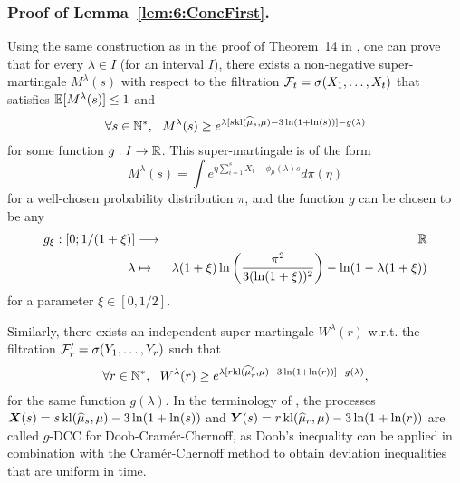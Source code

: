 \subsubsection{Proof of Lemma~\ref{lem:6:ConcFirst}.}
\label{app:6:proofConcFirst}
%
Using the same construction as in the proof of Theorem~14 in \cite{KK18Martingales}, one can prove that for every $\lambda \in I$ (for an interval $I$), there exists a non-negative super-martingale $M^\lambda (s)$ with respect to the filtration $\mathcal{F}_t = \sigma(X_1,\dots,X_t)$ that satisfies $\mathbb{E}[M^\lambda(s)] \leq 1$ and
\[\forall s \in \mathbb{N}^*, \ \ M^\lambda (s) \geq e^{\lambda [s\mathrm{kl}(\widehat{\mu}_s,\mu) - 3\ln(1+\ln(s))] - g(\lambda)}\]
for some function $g : I \rightarrow \mathbb{R}$. This super-martingale is of the form
\[M^\lambda (s) = \int e^{\eta\sum_{i=1}^s X_i - \phi_\mu(\lambda)s} d\pi(\eta)\]
for a well-chosen probability distribution $\pi$, and the function $g$ can be chosen to be any
\begin{eqnarray*}
    g_{\xi} : \left[0; 1/(1+\xi)\right] & \longrightarrow & \mathbb{R} \\
    \lambda & \mapsto & \lambda(1+\xi) \ln \left(\frac{\pi^2}{3(\ln(1+\xi))^2}\right) -  \ln(1 - \lambda(1 + \xi))
\end{eqnarray*}
for a parameter $\xi \in [0,1/2]$.

Similarly, there exists an independent super-martingale $W^\lambda (r)$ w.r.t. the filtration $\mathcal{F}_r' = \sigma(Y_1,\dots,Y_r)$ such that
\[\forall r \in \mathbb{N}^*, \ \ W^\lambda (r) \geq e^{\lambda [r\mathrm{kl}(\widehat{\mu}'_r,\mu) - 3\ln(1+\ln(r))] - g(\lambda)},\]
for the same function $g(\lambda)$. In the terminology of \cite{KK18Martingales}, the processes $\bm{X}(s) = s \, \mathrm{kl}(\widehat{\mu}_s,\mu) - 3\ln(1+\ln(s))$ and $\bm{Y}(s) = r \, \mathrm{kl}(\widehat{\mu}_r,\mu) - 3\ln(1+\ln(r))$ are called $g$-DCC for Doob-Cram\'er-Chernoff, as Doob's inequality can be applied in combination with the Cram\'er-Chernoff method to obtain deviation inequalities that are uniform in time.

